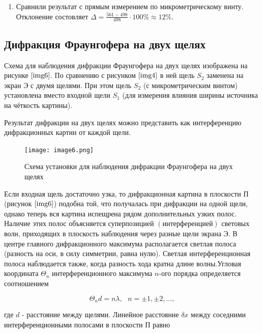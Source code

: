 \documentclass[a4paper,12pt]{article} %
\begin{document}
\begin{enumerate}
\begin{enumerate}
    \centering{}

    \item Сравнили результат с прямым измерением по микрометрическому винту. Отклонение состовляет $\Delta=\frac{561-498}{498}\cdot100\%\approx12\%$.
        
    \end{enumerate}
\end{enumerate}

\subsection{Дифракция Фраунгофера на двух щелях}

Схема для наблюдения дифракции Фраунгофера на двух щелях изображена на рисунке $\ref{img6}$. По сравнению с рисунком $\ref{img4}$ в ней щель $S_2$ заменена на экран $\text{Э}$ с двумя щелями. При этом щель $S_2$ (с микрометрическим винтом) установлена вместо входной щели $S_1$ (для измерения влияния ширины источника на чёткость картины).

Результат дифракции на двух щелях можно представить как $\text{интерференцию}$ дифракционных картин от каждой щели.

\begin{figure}[h]
\begin{center}
    \texttt{[image: image6.png]}
\end{center}
\caption{Схема установки для наблюдения дифракции Фраунгофера на двух щелях}
\label{img6}
\end{figure}

Если входная щель достаточно узка, то дифракционная картина в плоскости $\text{П}$ (рисунок $\ref{img6}$) подобна той, что получалась при дифракции на одной щели, однако теперь вся картина испещрена рядом дополнительных узких полос. Наличие этих полос объясняется суперпозицией $(\text{интерференцией})$ световых волн, приходящих в плоскость наблюдения через разные щели экрана $\text{Э}$. В центре главного дифракционного максимума располагается светлая полоса (разность на оси, в силу симметрии, равна нулю). Светлая интерференционная полоса наблюдается также, когда разность хода кратна длине волны.Угловая координата $\Theta_{n}$ интерференционного максимума $n$-ого порядка определяется соотношением

\[ \Theta_{n}d=n\lambda, \text{ }n=\pm1, \pm2,..., \]

где $d$ - расстояние между щелями. Линейное расстояние $\delta x$ между соседними интерференционными полосами в плоскости $\text{П}$ равно
\end{document}
